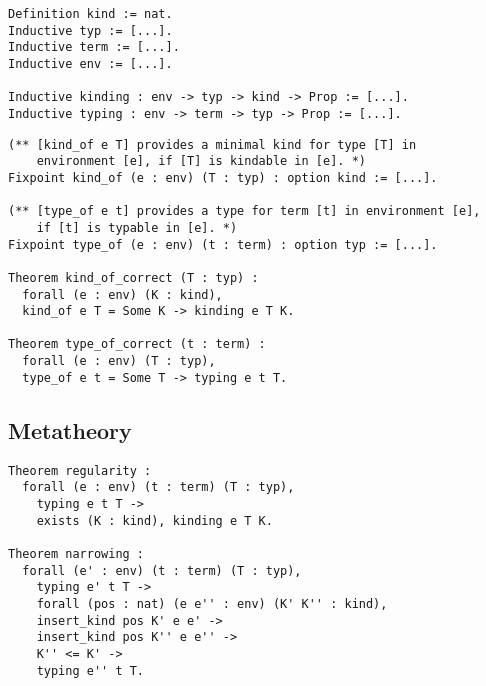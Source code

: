 \documentclass{beamer}
\begin{document}
\begin{frame}[fragile]

\begin{verbatim}
Definition kind := nat.
Inductive typ := [...].
Inductive term := [...].
Inductive env := [...].

Inductive kinding : env -> typ -> kind -> Prop := [...].
Inductive typing : env -> term -> typ -> Prop := [...].
\end{verbatim}

\end{frame}

\begin{frame}[fragile]



\begin{verbatim}
(** [kind_of e T] provides a minimal kind for type [T] in
    environment [e], if [T] is kindable in [e]. *)
Fixpoint kind_of (e : env) (T : typ) : option kind := [...].

(** [type_of e t] provides a type for term [t] in environment [e],
    if [t] is typable in [e]. *)
Fixpoint type_of (e : env) (t : term) : option typ := [...].

Theorem kind_of_correct (T : typ) :
  forall (e : env) (K : kind), 
  kind_of e T = Some K -> kinding e T K.

Theorem type_of_correct (t : term) : 
  forall (e : env) (T : typ), 
  type_of e t = Some T -> typing e t T.
\end{verbatim}

\end{frame}

\subsection{Metatheory}

\begin{frame}[fragile]

\begin{verbatim}
Theorem regularity :
  forall (e : env) (t : term) (T : typ),
    typing e t T ->
    exists (K : kind), kinding e T K.

Theorem narrowing :
  forall (e' : env) (t : term) (T : typ),
    typing e' t T ->
    forall (pos : nat) (e e'' : env) (K' K'' : kind),
    insert_kind pos K' e e' ->
    insert_kind pos K'' e e'' ->
    K'' <= K' ->
    typing e'' t T.
\end{verbatim}

\end{frame}
\end{document}
